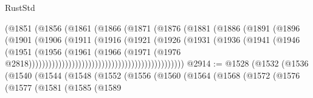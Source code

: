 \begin{lexlean}{RustStd}
\begin{coremodule}
{\begin{coremodule}
{{{{{{{{{{{{{{{{{{{{{{{{{{{{{{{{{{{{{{{{{{{{{                                              (@1851
                                                (@1856
                                                  (@1861
                                                    (@1866
                                                      (@1871
                                                        (@1876
                                                          (@1881
                                                            (@1886
                                                              (@1891
                                                                (@1896
                                                                  (@1901
                                                                    (@1906
                                                                      (@1911
                                                                        (@1916
                                                                          (@1921
                                                                            (@1926
                                                                              (@1931
                                                                                (@1936
                                                                                  (@1941
                                                                                    (@1946
                                                                                      (@1951
                                                                                        (@1956
                                                                                          (@1961
                                                                                            (@1966
                                                                                              (@1971
                                                                                                (@1976
                                                                                                  @2818)))))))))))))))))))))))))))))))))))))))))))))))
@2914 := @1528
    (@1532
      (@1536
        (@1540
          (@1544
            (@1548
              (@1552
                (@1556
                  (@1560
                    (@1564
                      (@1568
                        (@1572
                          (@1576
                            (@1577
                              (@1581
                                (@1585
                                  (@1589
}}}}}}}}}}}}}}}}}}}}}}}}}}}}}}}}}}}}}}}}}}}}}
\end{coremodule}}
\end{coremodule}
\end{lexlean}
